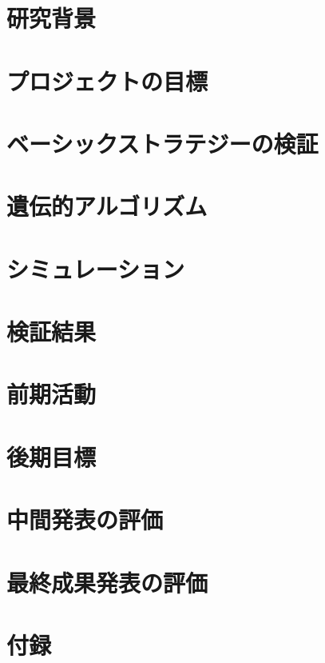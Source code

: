 \documentclass[11pt,a4paper,oneside]{jsbook}
\begin{document}
\tableofcontents
\newpage


\chapter{研究背景}





\chapter{プロジェクトの目標}

\chapter{ベーシックストラテジーの検証}


\chapter{遺伝的アルゴリズム}


\chapter{シミュレーション}


\chapter{検証結果}



\chapter{前期活動}

\chapter{後期目標}

\chapter{中間発表の評価}

\chapter{最終成果発表の評価}




\chapter{付録}


%
%
%
\end{document}
